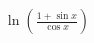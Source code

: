\documentclass[preview]{standalone}
\begin{document}
\begin{align*}
\ln\left( \frac{1 + \sin{x}}{\cos{x}} \right)
\end{align*}
\end{document}
